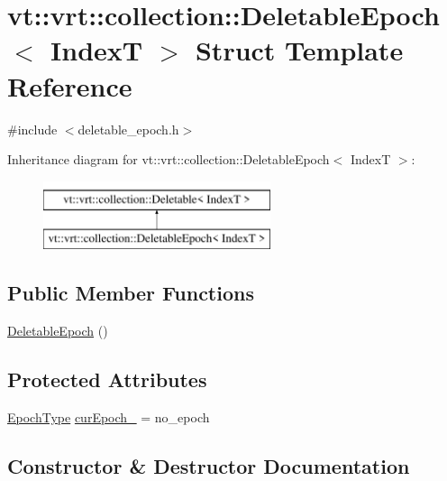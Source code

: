 \hypertarget{structvt_1_1vrt_1_1collection_1_1_deletable_epoch}{}\section{vt\+:\+:vrt\+:\+:collection\+:\+:Deletable\+Epoch$<$ IndexT $>$ Struct Template Reference}
\label{structvt_1_1vrt_1_1collection_1_1_deletable_epoch}


{\ttfamily \#include $<$deletable\+\_\+epoch.\+h$>$}

Inheritance diagram for vt\+:\+:vrt\+:\+:collection\+:\+:Deletable\+Epoch$<$ IndexT $>$\+:\begin{figure}[H]
\begin{center}
\leavevmode
\includegraphics[height=2.000000cm]{structvt_1_1vrt_1_1collection_1_1_deletable_epoch}
\end{center}
\end{figure}
\subsection*{Public Member Functions}
\begin{DoxyCompactItemize}
\item 
\hyperlink{structvt_1_1vrt_1_1collection_1_1_deletable_epoch_aee7724bfa81b13108c3ef69a1a035985}{Deletable\+Epoch} ()
\end{DoxyCompactItemize}
\subsection*{Protected Attributes}
\begin{DoxyCompactItemize}
\item 
\hyperlink{namespacevt_a985a5adf291c34a3ca263b3378388236}{Epoch\+Type} \hyperlink{structvt_1_1vrt_1_1collection_1_1_deletable_epoch_acba17c908f0511a830712bb44894ceac}{cur\+Epoch\+\_\+} = no\+\_\+epoch
\end{DoxyCompactItemize}


\subsection{Constructor \& Destructor Documentation}
\mbox{\label{structvt_1_1vrt_1_1collection_1_1_deletable_epoch_aee7724bfa81b13108c3ef69a1a035985}} 
